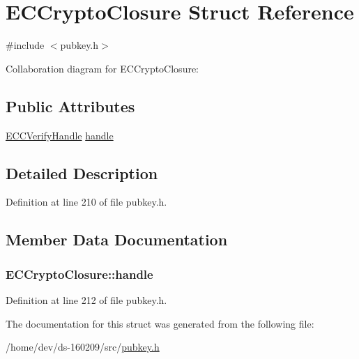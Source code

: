 \hypertarget{struct_e_c_crypto_closure}{}\section{E\+C\+Crypto\+Closure Struct Reference}
\label{struct_e_c_crypto_closure}


{\ttfamily \#include $<$pubkey.\+h$>$}



Collaboration diagram for E\+C\+Crypto\+Closure\+:
\subsection*{Public Attributes}
\begin{DoxyCompactItemize}
\item 
\hyperlink{class_e_c_c_verify_handle}{E\+C\+C\+Verify\+Handle} \hyperlink{struct_e_c_crypto_closure_a3c20e00d41d7dd286637034aae423611}{handle}
\end{DoxyCompactItemize}


\subsection{Detailed Description}


Definition at line 210 of file pubkey.\+h.



\subsection{Member Data Documentation}
\hypertarget{struct_e_c_crypto_closure_a3c20e00d41d7dd286637034aae423611}{}
\subsubsection[{handle}]{ E\+C\+Crypto\+Closure\+::handle}\label{struct_e_c_crypto_closure_a3c20e00d41d7dd286637034aae423611}


Definition at line 212 of file pubkey.\+h.



The documentation for this struct was generated from the following file\+:\begin{DoxyCompactItemize}
\item 
/home/dev/ds-\/160209/src/\hyperlink{pubkey_8h}{pubkey.\+h}\end{DoxyCompactItemize}
